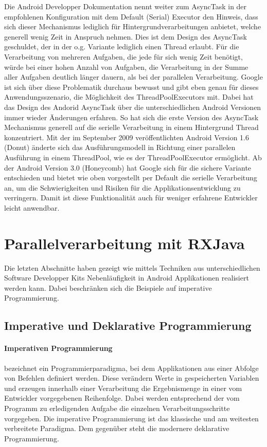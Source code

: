 \documentclass[12pt,oneside,a4paper,bibtotoc,liststotoc]{scrreprt}
\begin{document}
Die Android Developper Dokumentation nennt weiter zum AsyncTask in der empfohlenen Konfiguration mit dem Default (Serial) Executor den Hinweis, dass sich dieser Mechanismus lediglich für Hintergrundverarbeitungen anbietet, welche generell wenig Zeit in Anspruch nehmen. Dies ist dem Design des AsyncTask geschuldet, der in der o.g. Variante lediglich einen Thread erlaubt. Für die Verarbeitung von mehreren Aufgaben, die jede für sich wenig Zeit benötigt, würde bei einer hohen Anzahl von Aufgaben, die Verarbeitung in der Summe aller Aufgaben deutlich länger dauern, als bei der parallelen Verarbeitung. Google ist sich über diese Problematik durchaus bewusst und gibt eben genau für dieses Anwendungsszenario, die Möglichkeit des ThreadPoolExecutors mit. Dabei hat das Design des Andorid AsyncTask über die unterschiedlichen Android Versionen immer wieder Änderungen erfahren. So hat sich die erste Version des AsyncTask Mechanismus generell auf die serielle Verarbeitung in einem Hintergrund Thread konzentriert. Mit der im September 2009 veröffentlichten Android Version 1.6 (Donut) änderte sich das Ausführungsmodell in Richtung einer parallelen Ausführung in einem ThreadPool, wie es der ThreadPoolExecutor ermöglicht. Ab der Android Version 3.0 (Honeycomb) hat Google sich für die sichere Variante entschieden und bietet wie oben vorgestellt per Default die serielle Verarbeitung an, um die Schwierigkeiten und Risiken für die Applikationsentwicklung zu verringern. Damit ist diese Funktionalität auch für weniger erfahrene Entwickler leicht anwendbar.
\section{Parallelverarbeitung mit RXJava}
Die letzten Abschnitte haben gezeigt wie mittels Techniken aus unterschiedlichen Software Developper Kits Nebenläufigkeit in Android Applikationen realisiert werden kann. Dabei beschränken sich die Beispiele auf imperative Programmierung.
\subsection{Imperative und Deklarative Programmierung}
\paragraph{Imperativen Programmierung} bezeichnet ein Programmierparadigma, bei dem Applikationen aus einer Abfolge von Befehlen definiert werden. Diese verändern Werte in gespeicherten Variablen und erzeugen innerhalb einer Verarbeitung die Ergebnismenge in einer vom Entwickler vorgegebenen Reihenfolge. Dabei werden entsprechend der vom Programm zu erledigenden Aufgabe die einzelnen Verarbeitungsschritte vorgegeben. Die imperative Programmierung ist das klassische und am weitesten verbreitete Paradigma. Dem gegenüber steht die modernere deklarative Programmierung.
\end{document}
